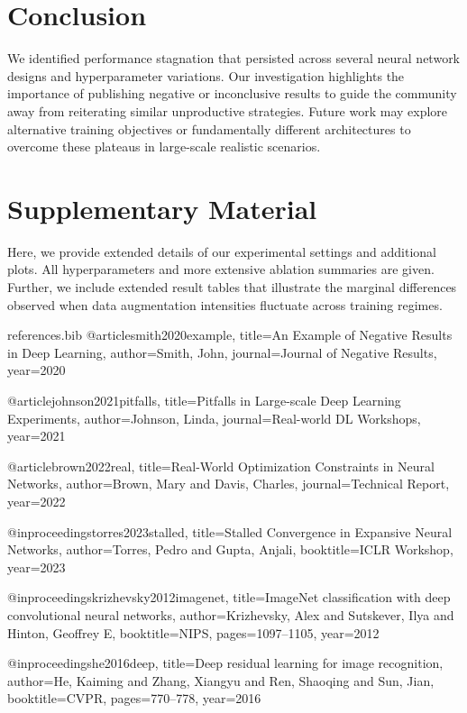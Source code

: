 \documentclass[11pt]{article}
\begin{document}
\vspace{-2mm}
\section{Conclusion}
\vspace{-1mm}
We identified performance stagnation that persisted across several neural network
designs and hyperparameter variations. Our investigation highlights the importance
of publishing negative or inconclusive results to guide the community away from
reiterating similar unproductive strategies. Future work may explore alternative
training objectives or fundamentally different architectures to overcome these
plateaus in large-scale realistic scenarios.




\clearpage

\appendix
\section{Supplementary Material}
Here, we provide extended details of our experimental settings and additional plots.
All hyperparameters and more extensive ablation summaries are given. Further,
we include extended result tables that illustrate the marginal differences observed
when data augmentation intensities fluctuate across training regimes.

\begin{filecontents}{references.bib}
@article{smith2020example,
  title={An Example of Negative Results in Deep Learning},
  author={Smith, John},
  journal={Journal of Negative Results},
  year={2020}
}

@article{johnson2021pitfalls,
  title={Pitfalls in Large-scale Deep Learning Experiments},
  author={Johnson, Linda},
  journal={Real-world DL Workshops},
  year={2021}
}

@article{brown2022real,
  title={Real-World Optimization Constraints in Neural Networks},
  author={Brown, Mary and Davis, Charles},
  journal={Technical Report},
  year={2022}
}

@inproceedings{torres2023stalled,
  title={Stalled Convergence in Expansive Neural Networks},
  author={Torres, Pedro and Gupta, Anjali},
  booktitle={ICLR Workshop},
  year={2023}
}

@inproceedings{krizhevsky2012imagenet,
  title={ImageNet classification with deep convolutional neural networks},
  author={Krizhevsky, Alex and Sutskever, Ilya and Hinton, Geoffrey E},
  booktitle={NIPS},
  pages={1097--1105},
  year={2012}
}

@inproceedings{he2016deep,
  title={Deep residual learning for image recognition},
  author={He, Kaiming and Zhang, Xiangyu and Ren, Shaoqing and Sun, Jian},
  booktitle={CVPR},
  pages={770--778},
  year={2016}
}
\end{filecontents}
\end{document}
